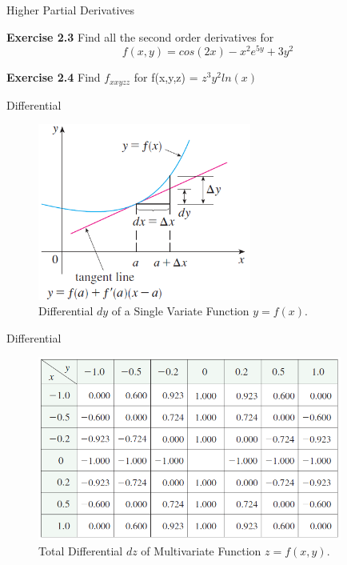 \documentclass[aspectratio=169, UTF8]{ctexbeamer}
\begin{document}
    \begin{frame}[t]{Higher Partial Derivatives}
        \par \textbf{Exercise 2.3} Find all the second order derivatives for 
        \begin{equation*}
            f(x,y) = cos(2x) - x^2e^{5y} + 3y^2
        \end{equation*}
        \par \textbf{Exercise 2.4} Find $f_{xxyzz}$ for f(x,y,z) = $z^3y^2ln(x)$
    \end{frame}
    
    \begin{frame}{Differential}
        \begin{figure}
            \includegraphics[width = 7cm]{f10}
            \caption{Differential $dy$ of a Single Variate Function $y = f(x)$.}
        \end{figure}
    \end{frame}


    \begin{frame}{Differential}
        \begin{figure}
            \includegraphics[width = 10cm]{f6}
            \caption{Total Differential $dz$ of Multivariate Function $z = f(x,y)$.}
        \end{figure}
    \end{frame}
\end{document}
